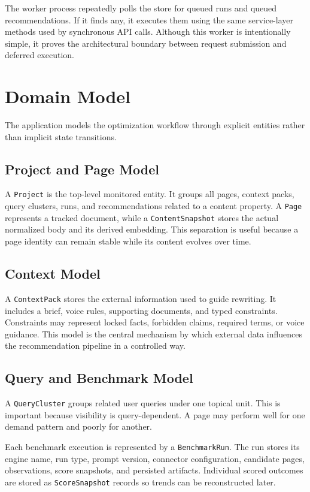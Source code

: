 The worker process repeatedly polls the store for queued runs and queued recommendations. If
it finds any, it executes them using the same service-layer methods used by synchronous API
calls. Although this worker is intentionally simple, it proves the architectural boundary between
request submission and deferred execution.

\section{Domain Model}

The application models the optimization workflow through explicit entities rather than implicit
state transitions.

\subsection{Project and Page Model}

A \texttt{Project} is the top-level monitored entity. It groups all pages, context packs, query
clusters, runs, and recommendations related to a content property. A \texttt{Page} represents a
tracked document, while a \texttt{ContentSnapshot} stores the actual normalized body and its
derived embedding. This separation is useful because a page identity can remain stable while its
content evolves over time.

\subsection{Context Model}

A \texttt{ContextPack} stores the external information used to guide rewriting. It includes a
brief, voice rules, supporting documents, and typed constraints. Constraints may represent
locked facts, forbidden claims, required terms, or voice guidance. This model is the central
mechanism by which external data influences the recommendation pipeline in a controlled way.

\subsection{Query and Benchmark Model}

A \texttt{QueryCluster} groups related user queries under one topical unit. This is important
because visibility is query-dependent. A page may perform well for one demand pattern and
poorly for another.

Each benchmark execution is represented by a \texttt{BenchmarkRun}. The run stores its engine
name, run type, prompt version, connector configuration, candidate pages, observations, score
snapshots, and persisted artifacts. Individual scored outcomes are stored as
\texttt{ScoreSnapshot} records so trends can be reconstructed later.

